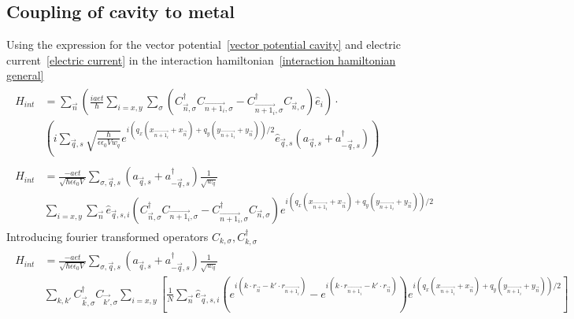 \documentclass{article}
\begin{document}
\subsection{Coupling of cavity to metal}
Using the expression for the vector potential~\ref{vector potential cavity} and electric current~\ref{electric current} in the interaction hamiltonian~\ref{interaction hamiltonian general}
\begin{align*}
    \begin{split}
    H_{int} &= \sum_{\vec{n}} \left(\frac{iaet}{\hbar} \sum_{i=x,y}\sum_{\sigma} (C_{\vec{n},\sigma}^{\dagger} C_{\vec{n + 1_i},\sigma} - C_{\vec{n + 1_i},\sigma}^{\dagger} C_{\vec{n},\sigma})\hat{e}_i\right) \cdot \\     
            &\left(i \sum_{\vec{q},s} \sqrt{\frac{\hbar}{\epsilon \epsilon_0 V w_q}} e^{i\left(q_x \left(x_{\vec{n + 1_i}} + x_{\vec{n}} \right) + q_y \left(y_{\vec{n + 1_i}} + y_{\vec{n}} \right)\right)/2} \hat{e}_{\vec{q},s}\left(a_{\vec{q},s} + a_{-\vec{q}, s}^{\dagger}\right)\right)
    \end{split}\\
    \begin{split}
    H_{int} &= \frac{-aet}{\sqrt{\hbar \epsilon \epsilon_0 V} } \sum_{\sigma,\vec{q},s} \left(a_{\vec{q},s} + a_{-\vec{q}, s}^{\dagger}\right) \frac{1}{\sqrt{w_q}} \\ 
            &  \sum_{i=x,y} \sum_{\vec{n}} \hat{e}_{\vec{q},s,i} (C_{\vec{n},\sigma}^{\dagger} C_{\vec{n + 1_i},\sigma} - C_{\vec{n + 1_i},\sigma}^{\dagger} C_{\vec{n},\sigma}) e^{i\left(q_x \left(x_{\vec{n + 1_i}} + x_{\vec{n}} \right) + q_y \left(y_{\vec{n + 1_i}} + y_{\vec{n}} \right)\right)/2}
    \end{split}
     \label{interaction hamiltonian step 1}\textbf{}
\end{align*}
Introducing fourier transformed operators $C_{k,\sigma} , C_{k,\sigma}^{\dagger}$
\begin{align*}
    \begin{split}
    H_{int} &= \frac{-aet}{\sqrt{\hbar \epsilon \epsilon_0 V} } \sum_{\sigma,\vec{q},s} \left(a_{\vec{q},s} + a_{-\vec{q}, s}^{\dagger}\right) \frac{1}{\sqrt{w_q}} \\ 
            & \sum_{k,k'}   C_{\vec{k},\sigma}^{\dagger} C_{\vec{k'},\sigma} \sum_{i=x,y} \left[\frac{1}{N}\sum_{\vec{n}} \hat{e}_{\vec{q},s,i} ( e^{i\left(k \cdot r_{\vec{n}} - k' \cdot r_{\vec{n+1_i}} \right)} - e^{i\left(k \cdot r_{\vec{n+1_i}} - k' \cdot r_{\vec{n}} \right)}) e^{i\left(q_x \left(x_{\vec{n + 1_i}} + x_{\vec{n}} \right) + q_y \left(y_{\vec{n + 1_i}} + y_{\vec{n}} \right)\right)/2}\right]
    \end{split}
    \label{interaction hamiltonian step 2}
\end{align*}
\end{document}
